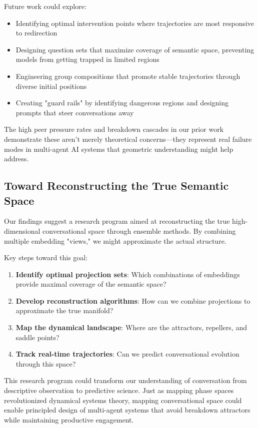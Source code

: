 \documentclass[11pt,letterpaper]{article}
\begin{document}
Future work could explore:
\begin{itemize}
\item Identifying optimal intervention points where trajectories are most responsive to redirection
\item Designing question sets that maximize coverage of semantic space, preventing models from getting trapped in limited regions
\item Engineering group compositions that promote stable trajectories through diverse initial positions
\item Creating "guard rails" by identifying dangerous regions and designing prompts that steer conversations away
\end{itemize}

The high peer pressure rates and breakdown cascades in our prior work demonstrate these aren't merely theoretical concerns—they represent real failure modes in multi-agent AI systems that geometric understanding might help address.

\subsection{Toward Reconstructing the True Semantic Space}

Our findings suggest a research program aimed at reconstructing the true high-dimensional conversational space through ensemble methods. By combining multiple embedding "views," we might approximate the actual structure.

Key steps toward this goal:
\begin{enumerate}
\item \textbf{Identify optimal projection sets}: Which combinations of embeddings provide maximal coverage of the semantic space?
\item \textbf{Develop reconstruction algorithms}: How can we combine projections to approximate the true manifold?
\item \textbf{Map the dynamical landscape}: Where are the attractors, repellers, and saddle points?
\item \textbf{Track real-time trajectories}: Can we predict conversational evolution through this space?
\end{enumerate}

This research program could transform our understanding of conversation from descriptive observation to predictive science. Just as mapping phase spaces revolutionized dynamical systems theory, mapping conversational space could enable principled design of multi-agent systems that avoid breakdown attractors while maintaining productive engagement.
\end{document}
